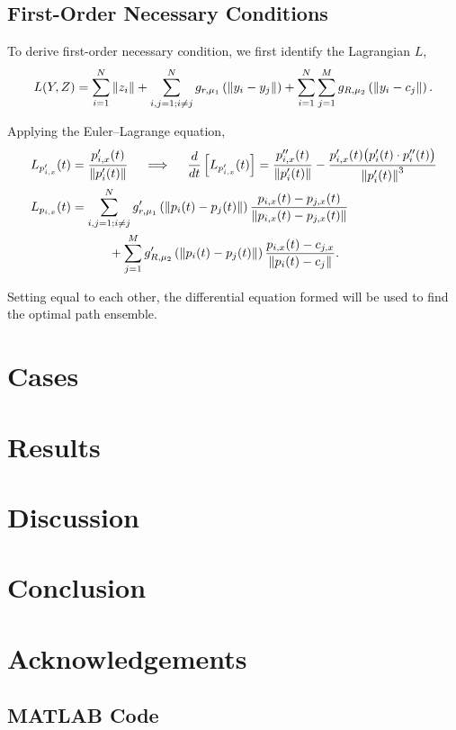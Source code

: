 \documentclass[11pt]{article}
\begin{document}
\subsection{First-Order Necessary Conditions}

To derive first-order necessary condition, we first identify the Lagrangian \(L\),
\begin{equation}
	L(Y,Z) = \sum_{i=1}^{N} \left\lVert z_i \right\rVert + \sum_{i,j = 1; i \neq j}^{N} g_{r,\mu_1}\left( \left\lVert y_i - y_j \right\rVert \right) + \sum_{i=1}^{N} \sum_{j=1}^{M} g_{R,\mu_2}\left( \left\lVert y_i - c_j \right\rVert \right).
\end{equation}

Applying the Euler--Lagrange equation,
\begin{align}
	&L_{p'_{i,x}}(t) = \frac{p'_{i,x}(t)}{\left\lVert p'_i(t) \right\rVert}
	\quad\implies\quad
	\frac{d}{dt}\left[ L_{p'_{i,x}}(t) \right] = \frac{p''_{i,x}(t)}{\left\lVert p'_i(t) \right\rVert} - \frac{p'_{i,x}(t) \big( p'_i(t) \cdot p''_i(t) \big)}{\left\lVert p'_i(t) \right\rVert^3}
	\label{eq:EL1} \\	
	&\begin{aligned}
	L_{p_{i,x}}(t) &= \sum_{i,j=1; i \neq j}^{N} g'_{r,\mu_1}\left( \left\lVert p_i(t) - p_j(t) \right\rVert \right) \frac{p_{i,x}(t) - p_{j,x}(t)}{\left\lVert p_{i,x}(t) - p_{j,x}(t) \right\rVert} \\
	&\qquad\quad+ \sum_{j=1}^{M} g'_{R,\mu_2}\left( \left\lVert p_i(t) - p_j(t) \right\rVert \right) \frac{p_{i,x}(t) - c_{j,x}}{\left\lVert p_i(t) - c_j \right\rVert}.
	\end{aligned}
	\label{eq:EL2}
\end{align}

Setting  equal to each other, the differential equation formed will be used to find the optimal path ensemble.

\section{Cases}

\section{Results}

\section{Discussion}

\section{Conclusion}

\section{Acknowledgements}




\begin{appendices}

\section{MATLAB Code}

\end{appendices}
\end{document}
